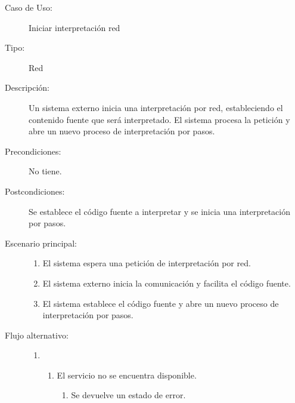 \begin{description}
   \item[Caso de Uso:]  Iniciar interpretación red 
   \item [Tipo:] Red
   \item[Descripción:] 
   Un sistema externo inicia una interpretación por red, estableciendo el contenido fuente que será interpretado.
   El sistema procesa la petición y abre un nuevo proceso de interpretación por pasos.
   \item[Precondiciones:] 
   No tiene. 
   \item[Postcondiciones:] 
   Se establece el código fuente a interpretar y se inicia una interpretación por pasos.
   \item[Escenario principal:] \hfill
   \begin{enumerate}
   \item El sistema espera una petición de interpretación por red.
   \item El sistema externo inicia la comunicación y facilita el código fuente.
   \item El sistema establece el código fuente y abre un nuevo proceso de interpretación por pasos. 
   \end{enumerate}
   \item[Flujo alternativo:] \hfill 
   \begin{enumerate} \itemsep1pt \parskip0pt 
   \setcounter{enumi}{0}
   \renewcommand{\labelenumi}{}
   \renewcommand{\labelenumiii}{\arabic{enumiii}.}
   \renewcommand{\labelenumii}{\arabic{enumi}\alph{enumii}.}
      \item 
      \begin {enumerate}
         \setcounter{enumii}{0}
         \item El servicio no se encuentra disponible.
         \begin{enumerate}
         \item Se devuelve un estado de error.
         \end{enumerate}
      \end{enumerate}
   \end{enumerate}
\end{description}


